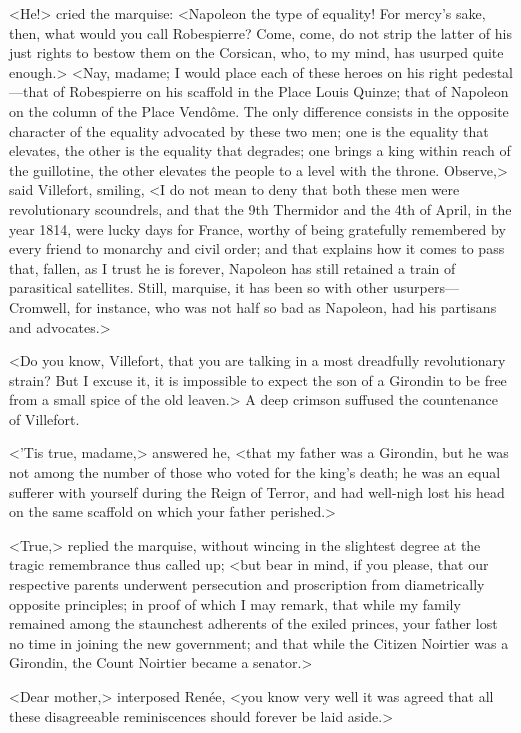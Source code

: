  <He!> cried the marquise: <Napoleon the type of equality! For mercy's sake, then, what would you call Robespierre? Come, come, do not strip the latter of his just rights to bestow them on the Corsican, who, to my mind, has usurped quite enough.>  <Nay, madame; I would place each of these heroes on his right pedestal—that of Robespierre on his scaffold in the Place Louis Quinze; that of Napoleon on the column of the Place Vendôme. The only difference consists in the opposite character of the equality advocated by these two men; one is the equality that elevates, the other is the equality that degrades; one brings a king within reach of the guillotine, the other elevates the people to a level with the throne. Observe,> said Villefort, smiling, <I do not mean to deny that both these men were revolutionary scoundrels, and that the 9th Thermidor and the 4th of April, in the year 1814, were lucky days for France, worthy of being gratefully remembered by every friend to monarchy and civil order; and that explains how it comes to pass that, fallen, as I trust he is forever, Napoleon has still retained a train of parasitical satellites. Still, marquise, it has been so with other usurpers—Cromwell, for instance, who was not half so bad as Napoleon, had his partisans and advocates.> 

 <Do you know, Villefort, that you are talking in a most dreadfully revolutionary strain? But I excuse it, it is impossible to expect the son of a Girondin to be free from a small spice of the old leaven.> A deep crimson suffused the countenance of Villefort. 

 <'Tis true, madame,> answered he, <that my father was a Girondin, but he was not among the number of those who voted for the king's death; he was an equal sufferer with yourself during the Reign of Terror, and had well-nigh lost his head on the same scaffold on which your father perished.> 

 <True,> replied the marquise, without wincing in the slightest degree at the tragic remembrance thus called up; <but bear in mind, if you please, that our respective parents underwent persecution and proscription from diametrically opposite principles; in proof of which I may remark, that while my family remained among the staunchest adherents of the exiled princes, your father lost no time in joining the new government; and that while the Citizen Noirtier was a Girondin, the Count Noirtier became a senator.> 

 <Dear mother,> interposed Renée, <you know very well it was agreed that all these disagreeable reminiscences should forever be laid aside.> 


